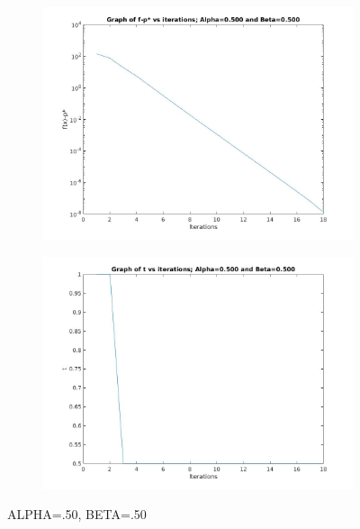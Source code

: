 \documentclass[12pt]{article}
\begin{document}
\begin{figure}[ht]
    \centering
    \begin{subfigure}{0.4\textwidth} %
        \includegraphics[width=\textwidth]{newton_f_alpha_50_beta_50.jpg}
    \end{subfigure}
    \vspace{1em} %
    \begin{subfigure}{0.4\textwidth} %
        \includegraphics[width=\textwidth]{newton_t_alpha_50_beta_50.jpg}
    \end{subfigure}
    \caption{ALPHA=.50, BETA=.50} %
\end{figure}
\end{document}
